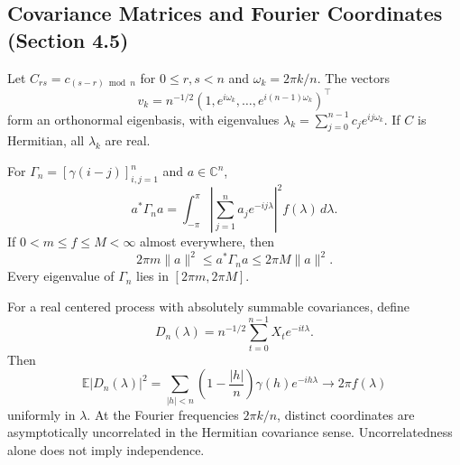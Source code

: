\subsection{Covariance Matrices and Fourier Coordinates (Section 4.5)}
\begin{proposition}
Let $C_{rs}=c_{(s-r)\bmod n}$ for $0\le r,s<n$ and
$\omega_k=2\pi k/n$. The vectors
\[
v_k=n^{-1/2}(1,e^{i\omega_k},\ldots,e^{i(n-1)\omega_k})^\top
\]
form an orthonormal eigenbasis, with eigenvalues
$\lambda_k=\sum_{j=0}^{n-1}c_je^{ij\omega_k}$.
If $C$ is Hermitian, all $\lambda_k$ are real.
\end{proposition}
\begin{proposition}
For $\Gamma_n=[\gamma(i-j)]_{i,j=1}^n$ and $a\in\mathbb C^n$,
\[
a^*\Gamma_na=\int_{-\pi}^{\pi}
\left|\sum_{j=1}^n a_je^{-ij\lambda}\right|^2 f(\lambda)\,d\lambda.
\]
If $0<m\le f\le M<\infty$ almost everywhere, then
\[
2\pi m\|a\|^2\le a^*\Gamma_na\le2\pi M\|a\|^2.
\]
Every eigenvalue of $\Gamma_n$ lies in $[2\pi m,2\pi M]$.
\end{proposition}
\begin{proposition}
For a real centered process with absolutely summable covariances, define
\[
D_n(\lambda)=n^{-1/2}\sum_{t=0}^{n-1}X_te^{-it\lambda}.
\]
Then
\[
\mathbb E|D_n(\lambda)|^2
=\sum_{|h|<n}\left(1-\frac{|h|}{n}\right)\gamma(h)e^{-ih\lambda}
\longrightarrow 2\pi f(\lambda)
\]
uniformly in $\lambda$. At the Fourier frequencies $2\pi k/n$, distinct
coordinates are asymptotically uncorrelated in the Hermitian covariance
sense. Uncorrelatedness alone does not imply independence.
\end{proposition}

